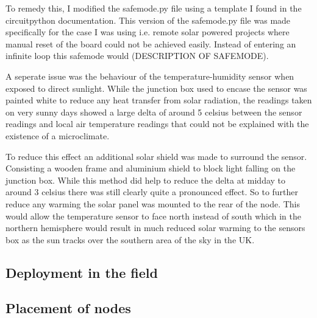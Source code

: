 To remedy this, I modified the safemode.py file using a template I found in the
circuitpython documentation. This version of the safemode.py file was made
specifically for the case I was using i.e. remote solar powered projects where
manual reset of the board could not be achieved easily. Instead of entering an
infinite loop this safemode would (DESCRIPTION OF SAFEMODE).

A seperate issue was the behaviour of the temperature-humidity sensor when
exposed to direct sunlight. While the junction box used to encase the sensor was
painted white to reduce any heat transfer from solar radiation, the readings
taken on very sunny days showed a large delta of around 5 celsius between the
sensor readings and local air temperature readings that could not be explained
with the existence of a microclimate.

To reduce this effect an additional solar shield was made to surround the
sensor. Consisting a wooden frame and aluminium shield to block light falling on
the junction box. While this method did help to reduce the delta at midday to
around 3 celsius there was still clearly quite a pronounced effect. So to
further reduce any warming the solar panel was mounted to the rear of the node.
This would allow the temperature sensor to face north instead of south which in
the northern hemisphere would result in much reduced solar warming to the
sensors box as the sun tracks over the southern area of the sky in the UK.

\subsection{Deployment in the field}

\subsection{Placement of nodes}
